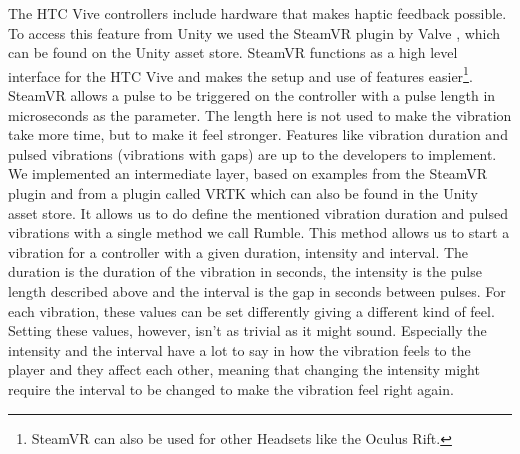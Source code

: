 The HTC Vive controllers include hardware that makes haptic feedback possible. To access this feature from Unity we used the SteamVR plugin by Valve \parencite{ValveCorporation2017}, which can be found on the Unity asset store. SteamVR functions as a high level interface for the HTC Vive and makes the setup and use of features easier\footnote{SteamVR can also be used for other Headsets like the Oculus Rift.}. SteamVR allows a pulse to be triggered on the controller with a pulse length in microseconds as the parameter. The length here is not used to make the vibration take more time, but to make it feel stronger. Features like vibration duration and pulsed vibrations (vibrations with gaps) are up to the developers to implement. We implemented an intermediate layer, based on examples from the SteamVR plugin and from a plugin called VRTK \parencite{SysdiaSolutions2017} which can also be found in the Unity asset store. It allows us to do define the mentioned vibration duration and pulsed vibrations with a single method we call Rumble. This method allows us to start a vibration for a controller with a given duration, intensity and interval. The duration is the duration of the vibration in seconds, the intensity is the pulse length described above and the interval is the gap in seconds between pulses. For each vibration, these values can be set differently giving a different kind of feel. Setting these values, however, isn't as trivial as it might sound. Especially the intensity and the interval have a lot to say in how the vibration feels to the player and they affect each other, meaning that changing the intensity might require the interval to be changed to make the vibration feel right again.

